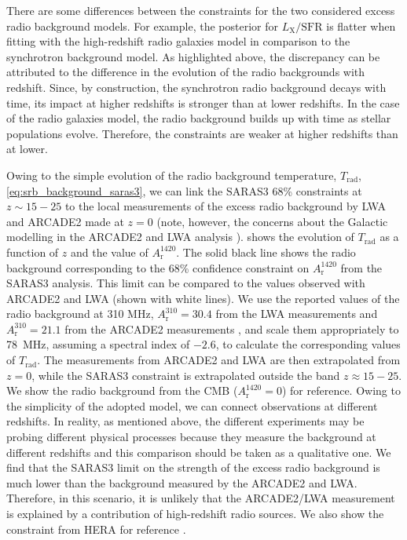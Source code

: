 There are some differences between the constraints for the two considered excess radio background models. For example, the posterior for $L_\mathrm{X}/\mathrm{SFR}$ is flatter when fitting with the high-redshift radio galaxies model in comparison to the synchrotron background model. As highlighted above, the discrepancy can be attributed to the difference in the evolution of the radio backgrounds with redshift. Since, by construction, the synchrotron radio background decays with time, its impact at higher redshifts is stronger than at lower redshifts. In the case of the radio galaxies model, the radio background builds up with time as stellar populations evolve. Therefore, the constraints are weaker at higher redshifts than at lower.

Owing to the simple evolution of the radio background temperature, $T_\mathrm{rad}$, \cref{eq:srb_background_saras3},
we can link the SARAS3 68\% constraints at $z\sim 15-25$ to the local measurements of the excess radio background by LWA  \cite{dowell_radio_2018} and ARCADE2 \cite{fixsen_arcade_2011} made at $z=0$ (note, however, the concerns about the Galactic modelling in the ARCADE2 and LWA analysis \cite{Subrahmanyan2013}).  
 shows the evolution of $T_\mathrm{rad}$ as a function of $z$ and the  value of $A_\mathrm{r}^{1420}$. The solid black line shows the radio background corresponding to the 68\% confidence constraint on $A_{\mathrm{r}}^{1420}$ from the SARAS3 analysis. This limit can be  compared to the values observed with ARCADE2  and LWA (shown with white lines). 
We use the reported values of the radio background at 310 MHz, $A_{\mathrm{r}}^{310} = 30.4$ from the LWA measurements \cite{dowell_radio_2018} and $A_{\mathrm{r}}^{310} = 21.1$ from the ARCADE2 measurements \cite{fixsen_arcade_2011}, and scale them appropriately to  78~MHz, assuming a spectral index of $-2.6$, to calculate the corresponding values of $T_\mathrm{rad}$.  The measurements from ARCADE2 and LWA are then extrapolated from $z=0$, while the SARAS3 constraint is extrapolated outside the band $z\approx 15 - 25$. We show the radio background from the CMB ($A_\mathrm{r}^{1420} = 0$) for reference. Owing to the simplicity of the adopted model, we can connect observations at different redshifts. In reality, as mentioned above, the different experiments may be probing different physical processes because they measure the background at different redshifts and this comparison should be taken as a qualitative one. We find that the SARAS3 limit on the strength of the excess radio background is much lower than the background measured by the ARCADE2 and LWA. Therefore, in this scenario, it is unlikely that the ARCADE2/LWA measurement is explained by a contribution of high-redshift radio sources. We also show the constraint from HERA for reference \cite{HERA_2022b}.

